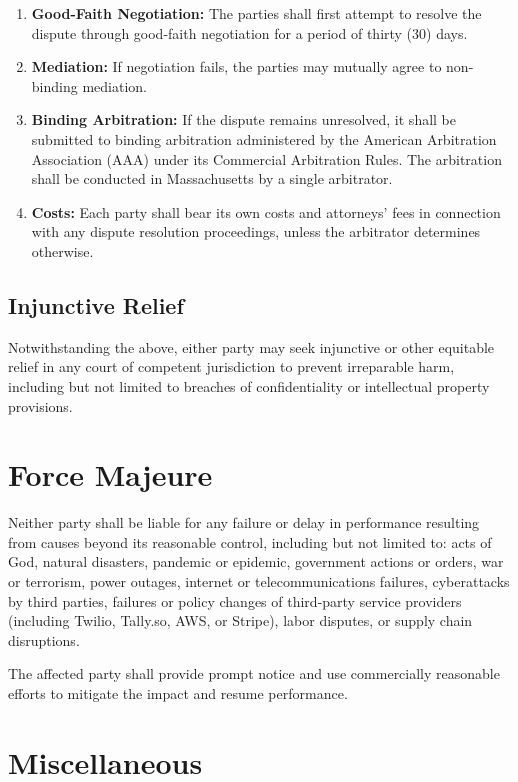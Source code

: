 \documentclass[11pt,letterpaper,parskip=half]{scrartcl}
\begin{document}
\begin{enumerate}[nosep, leftmargin=1.5em]
    \item \textbf{Good-Faith Negotiation:} The parties shall first attempt to resolve the dispute through good-faith negotiation for a period of thirty (30) days.
    \item \textbf{Mediation:} If negotiation fails, the parties may mutually agree to non-binding mediation.
    \item \textbf{Binding Arbitration:} If the dispute remains unresolved, it shall be submitted to binding arbitration administered by the American Arbitration Association (AAA) under its Commercial Arbitration Rules. The arbitration shall be conducted in Massachusetts by a single arbitrator.
    \item \textbf{Costs:} Each party shall bear its own costs and attorneys' fees in connection with any dispute resolution proceedings, unless the arbitrator determines otherwise.
\end{enumerate}

\subsection{Injunctive Relief}

Notwithstanding the above, either party may seek injunctive or other equitable relief in any court of competent jurisdiction to prevent irreparable harm, including but not limited to breaches of confidentiality or intellectual property provisions.

\section{Force Majeure}

Neither party shall be liable for any failure or delay in performance resulting from causes beyond its reasonable control, including but not limited to: acts of God, natural disasters, pandemic or epidemic, government actions or orders, war or terrorism, power outages, internet or telecommunications failures, cyberattacks by third parties, failures or policy changes of third-party service providers (including Twilio, Tally.so, AWS, or Stripe), labor disputes, or supply chain disruptions.

The affected party shall provide prompt notice and use commercially reasonable efforts to mitigate the impact and resume performance.

\section{Miscellaneous}
\end{document}
